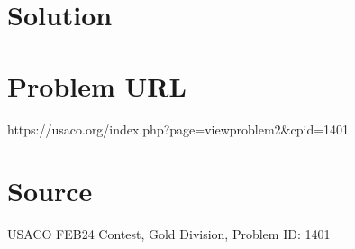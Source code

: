 \documentclass[12pt]{article}
\begin{document}
\section*{Solution}


\section*{Problem URL}
https://usaco.org/index.php?page=viewproblem2&cpid=1401

\section*{Source}
USACO FEB24 Contest, Gold Division, Problem ID: 1401
\end{document}
